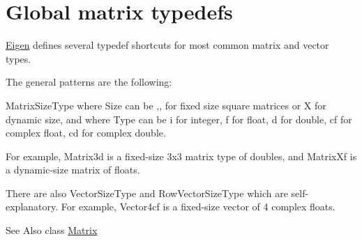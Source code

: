 \hypertarget{group__matrixtypedefs}{\section{Global matrix typedefs}
\label{group__matrixtypedefs}
}
\hyperlink{namespace_eigen}{Eigen} defines several typedef shortcuts for most common matrix and vector types.

The general patterns are the following\-:

{\ttfamily Matrix\-Size\-Type} where {\ttfamily Size} can be {},{},{} for fixed size square matrices or {\ttfamily X} for dynamic size, and where {\ttfamily Type} can be {\ttfamily i} for integer, {\ttfamily f} for float, {\ttfamily d} for double, {\ttfamily cf} for complex float, {\ttfamily cd} for complex double.

For example, {\ttfamily Matrix3d} is a fixed-\/size 3x3 matrix type of doubles, and {\ttfamily Matrix\-Xf} is a dynamic-\/size matrix of floats.

There are also {\ttfamily Vector\-Size\-Type} and {\ttfamily Row\-Vector\-Size\-Type} which are self-\/explanatory. For example, {\ttfamily Vector4cf} is a fixed-\/size vector of 4 complex floats.

\begin{DoxySeeAlso}{See Also}
class \hyperlink{class_matrix}{Matrix} 
\end{DoxySeeAlso}
